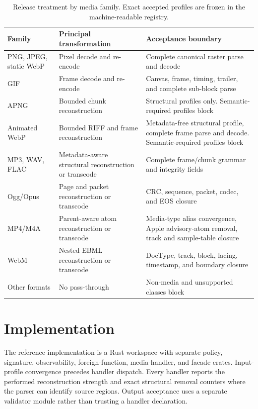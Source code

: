 \documentclass[preprint,12pt]{elsarticle}
\begin{document}
\begin{table}[t]
\centering
\caption{Release treatment by media family. Exact accepted profiles are frozen
in the machine-readable registry.}
\label{tab:profiles}
\begin{tabularx}{\textwidth}{L{0.20\textwidth}L{0.25\textwidth}Y}
\toprule
Family & Principal transformation & Acceptance boundary \\
\midrule
PNG, JPEG, static WebP & Pixel decode and re-encode & Complete canonical raster parse and decode \\
GIF & Frame decode and re-encode & Canvas, frame, timing, trailer, and complete sub-block parse \\
APNG & Bounded chunk reconstruction & Structural profiles only. Semantic-required profiles block \\
Animated WebP & Bounded RIFF and frame reconstruction & Metadata-free structural profile, complete frame parse and decode. Semantic-required profiles block \\
MP3, WAV, FLAC & Metadata-aware structural reconstruction or transcode & Complete frame/chunk grammar and integrity fields \\
Ogg/Opus & Page and packet reconstruction or transcode & CRC, sequence, packet, codec, and EOS closure \\
MP4/M4A & Parent-aware atom reconstruction or transcode & Media-type alias convergence, Apple advisory-atom removal, track and sample-table closure \\
WebM & Nested EBML reconstruction or transcode & DocType, track, block, lacing, timestamp, and boundary closure \\
Other formats & No pass-through & Non-media and unsupported classes block \\
\bottomrule
\end{tabularx}
\end{table}

\section{Implementation}\label{sec:implementation}

The reference implementation is a Rust workspace with separate policy,
signature, observability, foreign-function, media-handler, and facade crates.
Input-profile convergence precedes handler dispatch. Every handler reports the
performed reconstruction strength and exact structural removal counters where
the parser can identify source regions. Output acceptance uses a separate
validator module rather than trusting a handler declaration.
\end{document}
